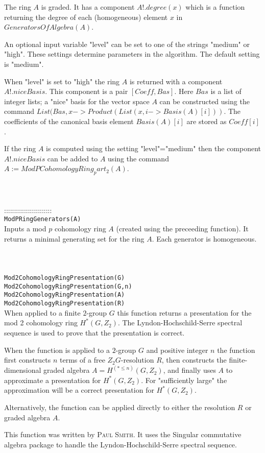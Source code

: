 \documentclass[a4paper,11pt]{report}
\begin{document}
{ The ring $A$ is graded. It has a component $A!.degree(x)$ which is a function returning the degree of each (homogeneous) element $x$ in $GeneratorsOfAlgebra(A)$. 

 An optional input variable "level" can be set to one of the strings "medium"
or "high". These settings determine parameters in the algorithm. The default
setting is "medium". 

 When "level" is set to "high" the ring $A$ is returned with a component $A!.niceBasis$. This component is a pair $[Coeff,Bas]$. Here $Bas$ is a list of integer lists; a "nice" basis for the vector space $A$ can be constructed using the command $List(Bas,x->Product(List(x,i->Basis(A)[i]))$. The coefficients of the canonical basis element $Basis(A)[i]$ are stored as $Coeff[i]$. 

 If the ring $A$ is computed using the setting "level"="medium" then the component $A!.niceBasis$ can be added to $A$ using the command $ A:=ModPCohomologyRing_part_2(A) $. \\
 \\
 \\
 \\
 ::::::::::::::::::::::::\\
 \texttt{ModPRingGenerators(A) }\\
 

 Inputs a mod $p$ cohomology ring $A$ (created using the preceeding function). It returns a minimal generating set
for the ring $A$. Each generator is homogeneous. \\
 \\
 \\
 \\
 \texttt{Mod2CohomologyRingPresentation(G) }\\
 \texttt{Mod2CohomologyRingPresentation(G,n) }\\
 \texttt{Mod2CohomologyRingPresentation(A) }\\
 \texttt{Mod2CohomologyRingPresentation(R)}\\
 

 When applied to a finite $2$-group $G$ this function returns a presentation for the mod 2 cohomology ring $H^*(G,Z_2)$. The Lyndon-Hochschild-Serre spectral sequence is used to prove that the
presentation is correct. 

 When the function is applied to a $2$-group $G$ and positive integer $n$ the function first constructs $n$ terms of a free $Z_2G$-resolution $R$, then constructs the finite-dimensional graded algebra $A=H^(*\le n)(G,Z_2)$, and finally uses $A$ to approximate a presentation for $H^*(G,Z_2)$. For "sufficiently large" the approximation will be a correct presentation
for $H^*(G,Z_2)$. 

 Alternatively, the function can be applied directly to either the resolution $R$ or graded algebra $A$. 

This function was written by \textsc{Paul Smith}. It uses the Singular commutative algebra package to handle the
Lyndon-Hochschild-Serre spectral sequence. \\
 \\
 \\
 }
\end{document}
